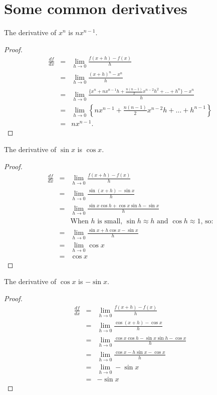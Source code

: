\section{Some common derivatives}

\begin{in_a_box}
The derivative of $x^n$ is $nx^{n-1}$.
\begin{proof}
\begin{eqnarray*}
\frac{df}{dx}&=&\lim_{h\to0}\frac{f(x+h)-f(x)}{h} \\
&=&\lim_{h\to0}\frac{(x+h)^n-x^n}{h} \\
&=&\lim_{h\to0}\frac{\{x^n + nx^{n-1}h+\frac{n(n-1)}{2}x^{n-2}h^2+\dots+h^{n}\}-x^n}{h} \\
&=&\lim_{h\to0}\left\{ nx^{n-1}+\frac{n(n-1)}{2}x^{n-2}h+\dots+h^{n-1}\right\} \\
&=&nx^{n-1}.
\end{eqnarray*}
\end{proof}
\end{in_a_box}

\begin{in_a_box}
The derivative of $\sin x$ is $\cos x$.
\begin{proof}
\begin{eqnarray*}
\frac{df}{dx}&=&\lim_{h\to0}\frac{f(x+h)-f(x)}{h} \\
&=&\lim_{h\to0}\frac{\sin(x+h)-\sin x}{h} \\
&=&\lim_{h\to0}\frac{\sin x\cos h + \cos x\sin h - \sin x}{h} \\
&&\text{When }h\text{ is small, }\sin h\approx h\text{ and }\cos h\approx 1\text{, so:}\\
&=&\lim_{h\to0}\frac{\sin x + h\cos x - \sin x}{h} \\
&=&\lim_{h\to0}\cos x \\
&=&\cos x
\end{eqnarray*}
\end{proof}
\end{in_a_box}

\begin{in_a_box}
The derivative of $\cos x$ is $-\sin x$.
\begin{proof}
\begin{eqnarray*}
\frac{df}{dx}&=&\lim_{h\to0}\frac{f(x+h)-f(x)}{h} \\
&=&\lim_{h\to0}\frac{\cos(x+h)-\cos x}{h} \\
&=&\lim_{h\to0}\frac{\cos x\cos h - \sin x\sin h - \cos x}{h} \\
&=&\lim_{h\to0}\frac{\cos x - h\sin x - \cos x}{h} \\
&=&\lim_{h\to0}-\sin x \\
&=&-\sin x
\end{eqnarray*}
\end{proof}
\end{in_a_box}

